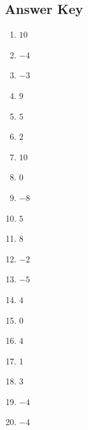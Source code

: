 \documentclass{article}
\begin{document}
\newpage

\subsection*{Answer Key}

\begin{enumerate}
\item $\displaystyle 10 $ \ 
\item $\displaystyle -4 $ \ 
\item $\displaystyle -3 $ \ 
\item $\displaystyle 9 $ \ 
\item $\displaystyle 5 $ \ 
\item $\displaystyle 2 $ \ 
\item $\displaystyle 10 $ \ 
\item $\displaystyle 0 $ \ 
\item $\displaystyle -8 $ \ 
\item $\displaystyle 5 $ \ 
\item $\displaystyle 8 $ \ 
\item $\displaystyle -2 $ \ 
\item $\displaystyle -5 $ \ 
\item $\displaystyle 4 $ \ 
\item $\displaystyle 0 $ \ 
\item $\displaystyle 4 $ \ 
\item $\displaystyle 1 $ \ 
\item $\displaystyle 3 $ \ 
\item $\displaystyle -4 $ \ 
\item $\displaystyle -4 $ \ 

\end{enumerate}
\end{document}
